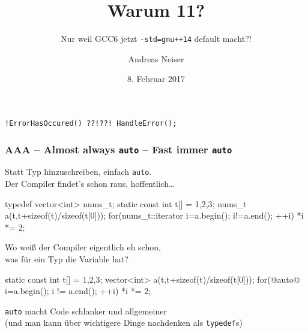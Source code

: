\documentclass[t,ngerman,usepdftitle=false]{beamer}
\author{Andreas Neiser}
\title{Warum \Cpp{}11?}
\subtitle{Nur weil GCC6 jetzt \lstinline|-std=gnu++14| default macht?!}
\date{8. Februar 2017}
\begin{document}
\begin{frame}[fragile]
  
    \maketitle
  
  \begin{center}
    \lstinline|!ErrorHasOccured() ??!??! HandleError();|
  \end{center}
\end{frame}


\begin{frame}[fragile]
  \frametitle{AAA -- Almost always \lstinline!auto! -- Fast immer \lstinline!auto! }
  Statt Typ hinzuschreiben, einfach \lstinline!auto!. \\ Der Compiler findet's schon raus, hoffentlich\ldots
  
\begin{cpplisting}
typedef vector<int> nums_t; 
static const int t[] = {1,2,3};
nums_t a(t,t+sizeof(t)/sizeof(t[0])); 
for(nums_t::iterator i=a.begin();  i!=a.end(); ++i)
  *i *= 2;
\end{cpplisting}

Wo weiß der Compiler eigentlich eh schon, \\ was für ein Typ die Variable hat?

\pause 
\lstset{firstnumber=6}
\begin{cpplisting}
static const int t[] = {1,2,3};
vector<int> a(t,t+sizeof(t)/sizeof(t[0])); 
for(@auto@ i=a.begin();  i != a.end(); ++i)
  *i *= 2;
\end{cpplisting}

\pause 
\begin{block}{}
  \centering
  \lstinline!auto! macht Code schlanker und allgemeiner\\ \small (und man kann über wichtigere Dinge nachdenken als \lstinline|typedef|s) 
\end{block}
  
\end{frame}
\end{document}
